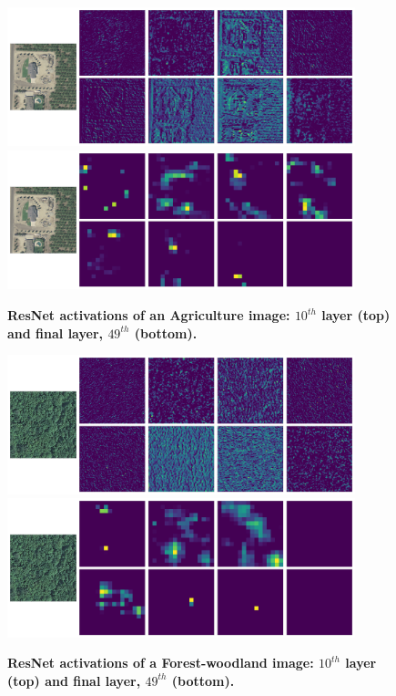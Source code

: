 \begin{figure}[H]
	\centering
	\includegraphics[width=0.9\textwidth]{Figures/activations/agriculture_l2_s1_activation_10.png}
	\includegraphics[width=0.9\textwidth]{Figures/activations/agriculture_l2_s1_activation_49.png}
	\captionsetup{width=1\linewidth}
	\caption{\textbf{ResNet activations of an Agriculture image: $10^{th}$ layer (top) and final layer, $49^{th}$ (bottom).}}
	\label{fig:act_agriculture}
\end{figure}

\begin{figure}[H]
	\centering
	\includegraphics[width=0.9\textwidth]{Figures/activations/forest-woodland_l0_s1_activation_10.png}
	\includegraphics[width=0.9\textwidth]{Figures/activations/forest-woodland_l0_s1_activation_49.png}
	\captionsetup{width=1\linewidth}
	\caption{\textbf{ResNet activations of a Forest-woodland image: $10^{th}$ layer (top) and final layer, $49^{th}$ (bottom).}}
	\label{fig:act_forest_woodland}
\end{figure}

